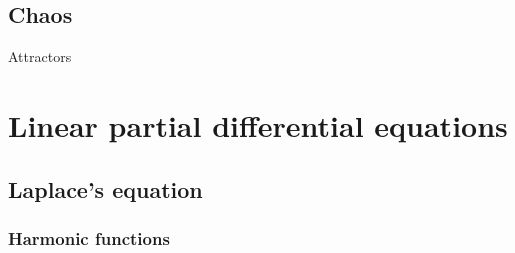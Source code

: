 \documentclass{../note}
\begin{document}
\chapter{Chaos}
Attractors







\part{Linear partial differential equations}


\chapter{Laplace's equation}
\section{Harmonic functions}
\begin{prb}
\end{prb}
\begin{prb}
\end{prb}


\begin{prb}
\end{prb}
\begin{prb}
\end{prb}
\begin{prb}
\end{prb}
\end{document}
